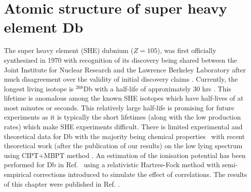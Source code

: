 \documentclass[10pt,a4paper, twoside, openright]{report}
\begin{document}
\chapter{Atomic structure of super heavy element Db } \label{chap:Db}
The super heavy element (SHE) dubnium ($Z=105$), was first officially synthesized in 1970 with recognition of its discovery being shared between the Joint Institute for Nuclear Research and the Lawrence Berkeley Laboratory after much disagreement over the validity of initial discovery claims \cite{Barber1992}.  Currently, the longest living isotope is $^{268}$Db with a half-life of approximately $ 30 $ hrs \cite{Schadel2012, Oganessian2005}. This lifetime  is anomalous among the known SHE isotopes which have half-lives of at most minutes or seconds. This relatively large half-life is promising for future experiments as it is typically the short lifetimes (along with the low production rates) which make SHE experiments difficult. There is limited experimental and theoretical data for Db with the majority being chemical properties~\cite{Schadel2012, Fricke1975} with recent theoretical work (after the publication of our results) on the low lying spectrum using CIPT+MBPT method \cite{Geddes2018}.  An estimation of the ionisation potential has been performed for Db in Ref.~\cite{Dzuba2016} using a relativistic 
 Hartree-Fock  method with semi-empirical corrections introduced to simulate the effect of correlations. The results of this chapter were published in Ref. \cite{LDFDb2018}.
\end{document}
